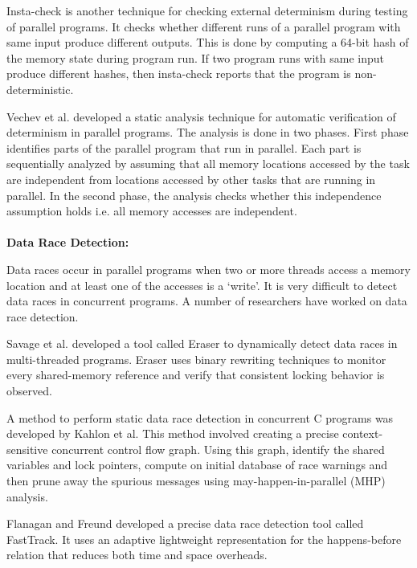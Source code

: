 Insta-check is another technique for checking external determinism during testing of parallel programs. It checks whether different runs of a parallel program with same input produce different outputs. This is done by computing a 64-bit hash of the memory state during program run. If two program runs with same input produce different hashes, then insta-check reports that the program is non-deterministic. 

Vechev et al. developed a static analysis technique for automatic verification of determinism in parallel programs. The analysis is done in two phases. First phase identifies parts of the parallel program that run in parallel. Each part is sequentially analyzed by assuming that all memory locations accessed by the task are independent from locations accessed by other tasks that are running in parallel. In the second phase, the analysis checks whether this independence assumption holds i.e. all memory accesses are independent.
\\
\\
\textbf{Data Race Detection: }

Data races occur in parallel programs when two or more threads access a memory location and at least one of the accesses is a ‘write’.  It is very difficult to detect data races in concurrent programs. A number of researchers have worked on data race detection.

Savage et al. developed a tool called Eraser to dynamically detect data races in multi-threaded programs. Eraser uses binary rewriting techniques to monitor every shared-memory reference and verify that consistent locking behavior is observed.

A method to perform static data race detection in concurrent C programs was developed by Kahlon et al. This method involved creating a precise context-sensitive concurrent control flow graph. Using this graph, identify the shared variables and lock pointers, compute on initial database of race warnings and then prune away the spurious messages using may-happen-in-parallel (MHP) analysis.

Flanagan and Freund developed a precise data race detection tool called FastTrack. It uses an adaptive lightweight representation for the happens-before relation that reduces both time and space overheads.

